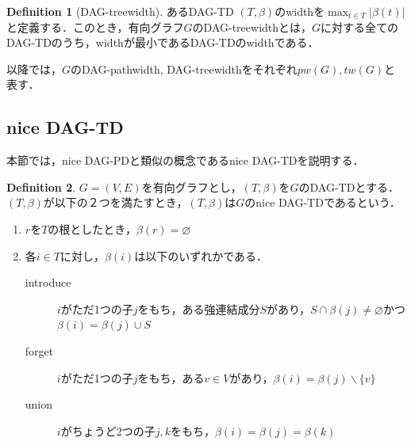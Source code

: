 \documentclass[master]{kuisthesis}		%
\theoremstyle{plain}
\theoremstyle{definition}
\newtheorem{definition*}{Definition}
\begin{document}
\begin{definition*}[DAG-treewidth]
    あるDAG-TD $(T, \beta)$のwidthを$\max_{t \in T}|\beta(t)|$と定義する．このとき，有向グラフ$G$のDAG-treewidthとは，$G$に対する全てのDAG-TDのうち，widthが最小であるDAG-TDのwidthである．
\end{definition*}

以降では，$G$のDAG-pathwidth, DAG-treewidthをそれぞれ$pw(G), tw(G)$と表す．


\subsection{nice DAG-TD}

本節では，nice DAG-PDと類似の概念であるnice DAG-TDを説明する．

\begin{definition*}
 $G=(V, E)$を有向グラフとし，$(T, \beta)$を$G$のDAG-TDとする．$(T, \beta)$が以下の２つを満たすとき，$(T, \beta)$は$G$のnice DAG-TDであるという．
 
\begin{enumerate}
    \item $r$を$T$の根としたとき，$\beta(r) = \varnothing$ 
    \item 各$i \in T$に対し，$\beta(i)$は以下のいずれかである．
    \begin{description}
          \item[introduce] $i$がただ1つの子$j$をもち，ある強連結成分$S$があり，$S \cap \beta(j) \neq \varnothing$かつ$\beta(i) = \beta(j) \cup S$
          \item[forget] $i$がただ1つの子$j$をもち，ある$v \in V$があり，$\beta(i) = \beta(j) \backslash \{v\}$
          \item[union] $i$がちょうど2つの子$j, k$をもち，$\beta(i) = \beta(j) = \beta(k)$
    \end{description}
    \end{enumerate}
\end{definition*}
\end{document}
